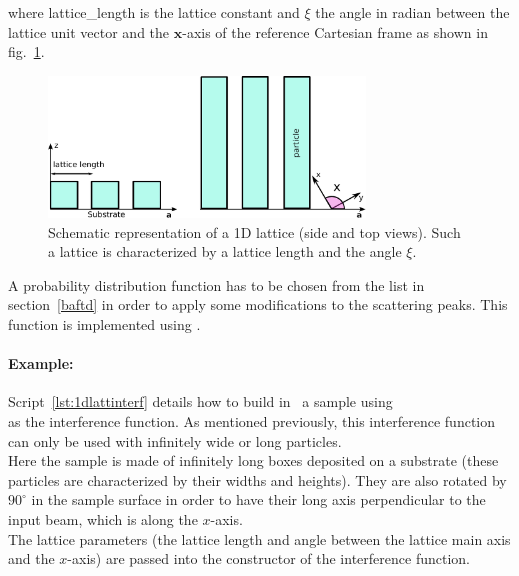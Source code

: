 \newpage
\subsubsection{} 
where lattice\_length is the lattice constant and $\xi$ the angle in radian between the lattice unit vector and the $\mathbf{x}$-axis of the reference Cartesian frame as shown in fig.~\ref{fig:1dgrating}.

\begin{figure}[ht]
\begin{center}
\includegraphics[width=0.75\textwidth]{fig/drawing/1DGrating.pdf}
\end{center}
\caption{Schematic representation of a 1D lattice (side and top views). Such a lattice is characterized by a lattice length and the angle $\xi$.}
\label{fig:1dgrating}
\end{figure}


\vspace{12pt}
A probability distribution function  has to be chosen from the list in section~\ref{baftd} in order to apply some modifications to the scattering peaks. This function is implemented using . 

\paragraph{Example:} Script~\ref{lst:1dlattinterf} details how to build in  \BornAgain\ a sample using\\  as the interference function. As mentioned previously, this interference function can only be used with infinitely wide or long particles.\\ Here the sample is made of infinitely long boxes deposited on a substrate (these particles are characterized by their widths and heights). They are also rotated by $90^{\circ}$  in the sample surface in order to have their long axis perpendicular to the input beam, which is along the $x$-axis.\\
 The lattice parameters (the lattice length and angle between the lattice main axis and the $x$-axis) are passed into the constructor of the interference function.

